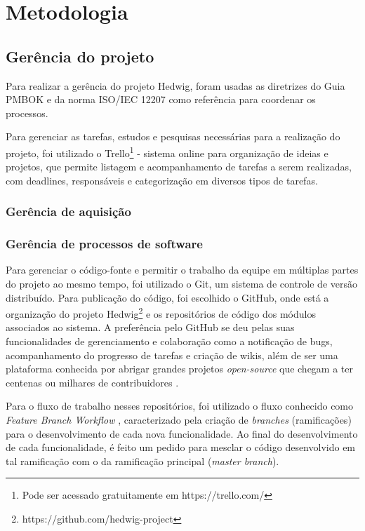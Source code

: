 \chapter{Metodologia}

\section{Gerência do projeto}
Para realizar a gerência do projeto Hedwig, foram usadas as diretrizes do Guia PMBOK \cite{pmi} e da norma ISO/IEC 12207 \cite{iso12207} como referência para coordenar os processos.

Para gerenciar as tarefas, estudos e pesquisas necessárias para a realização do projeto, foi utilizado o Trello\footnote{Pode ser acessado gratuitamente em https://trello.com/} - sistema online para organização de ideias e projetos, que permite listagem e acompanhamento de tarefas a serem realizadas, com deadlines, responsáveis e categorização em diversos tipos de tarefas.


\subsection{Gerência de aquisição}

\subsection{Gerência de processos de software}

Para gerenciar o código-fonte e permitir o trabalho da equipe em múltiplas partes do projeto ao mesmo tempo, foi utilizado o Git, um sistema de controle de versão distribuído. Para publicação do código, foi escolhido o GitHub, onde está a organização do projeto Hedwig\footnote{https://github.com/hedwig-project} e os repositórios de código dos módulos associados ao sistema. A preferência pelo GitHub se deu pelas suas funcionalidades de gerenciamento e colaboração como a notificação de bugs, acompanhamento do progresso de tarefas e criação de wikis, além de ser uma plataforma conhecida por abrigar grandes projetos \emph{open-source} que chegam a ter centenas ou milhares de contribuidores \cite{github}.

Para o fluxo de trabalho nesses repositórios, foi utilizado o fluxo conhecido como \textit{Feature Branch Workflow} \cite{atlassian}, caracterizado pela criação de \textit{branches} (ramificações) para o desenvolvimento de cada nova funcionalidade. Ao final do desenvolvimento de cada funcionalidade, é feito um pedido para mesclar o código desenvolvido em tal ramificação com o da ramificação principal (\textit{master branch}).

